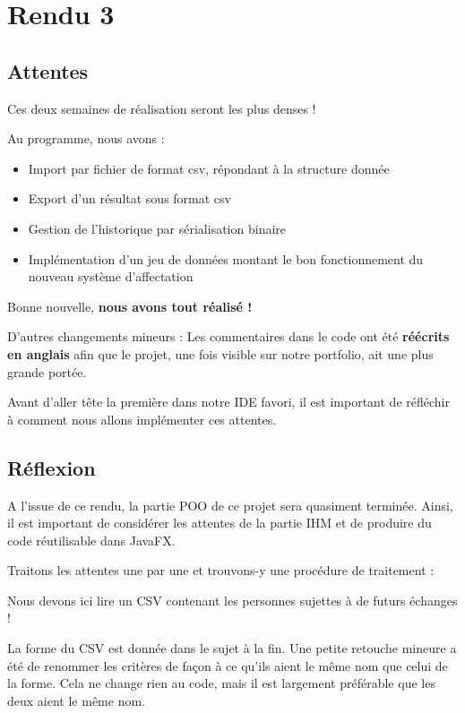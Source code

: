 \documentclass{mytex}
\begin{document}
\section{Rendu 3}

\subsection{Attentes}

Ces deux semaines de réalisation seront les plus denses !

Au programme, nous avons :

\begin{itemize}
	\item Import par fichier de format csv, répondant à la structure donnée
	\item Export d’un résultat sous format csv
	\item Gestion de l’historique par sérialisation binaire
	\item Implémentation d’un jeu de données montant le bon fonctionnement du nouveau système d’affectation
\end{itemize}

Bonne nouvelle, \textbf{nous avons tout réalisé !}

D'autres changements mineurs : 
Les commentaires dans le code ont été \textbf{réécrits en anglais} afin que le projet, une fois visible sur notre portfolio, ait une plus grande portée.

Avant d'aller tête la première dans notre IDE favori, il est important de réfléchir à comment nous allons implémenter ces attentes. 

\subsection{Réflexion}

A l'issue de ce rendu, la partie POO de ce projet sera quasiment terminée. Ainsi, il est important de considérer les attentes de la partie IHM et de produire du code réutilisable dans JavaFX.

Traitons les attentes une par une et trouvons-y une procédure de traitement : 


Nous devons ici lire un CSV contenant les personnes sujettes à de futurs échanges !

La forme du CSV est donnée dans le sujet à la fin.
Une petite retouche mineure a été de renommer les critères de façon à ce qu'ils aient le même nom que celui de la forme. Cela ne change rien au code, mais il est largement préférable que les deux aient le même nom.
\end{document}
